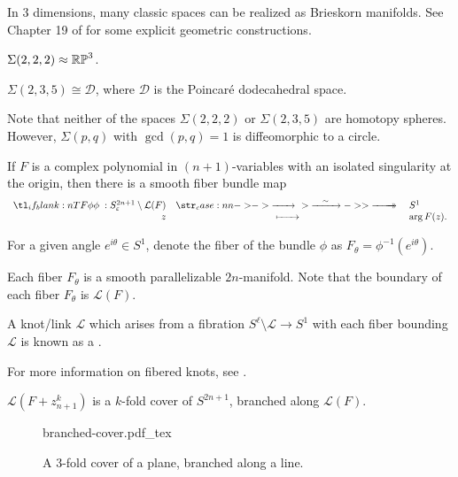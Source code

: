 In $3$ dimensions, many classic spaces can be realized as Brieskorn manifolds.
See Chapter 19 of \cite{kauffman1987knots} for some explicit geometric constructions.
\begin{proposition}
	$\Sigma(2,2,2)\approx \mathbb{RP}^3$.
\end{proposition}

\begin{proposition}
	$\Sigma(2,3,5)\cong \mathscr{D}$, where $\mathscr{D}$ is the Poincar\'e dodecahedral space.
\end{proposition}

Note that neither of the spaces $\Sigma(2,2,2)$ or $\Sigma(2,3,5)$ are homotopy spheres. However, $\Sigma(p,q)$ with $\gcd(p,q)=1$ is diffeomorphic to a circle.

\begin{theorem}\label{thm:fibration}
	If $F$ is a complex polynomial in $(n+1)$-variables with an isolated singularity at the origin, then there is a smooth fiber bundle map
	\[
		\lkxfunc{\phi}{S^{2n+1}_\varepsilon \setminus \L(F)}{S^1}{z}{\arg F(z).}
	\]
\end{theorem}

For a given angle $e^{i\theta}\in S^1$, denote the fiber of the bundle $\phi$ as $F_\theta = \phi^{-1}(e^{i\theta})$.

\begin{proposition}
	Each fiber $F_\theta$ is a smooth parallelizable $2n$-manifold.
	Note that the boundary of each fiber $F_\theta$ is $\mathcal{L}(F)$. 
\end{proposition}

\begin{definition}
	A knot/link $\mathcal{L}$ which arises from a fibration $S^\ell \setminus \mathcal{L} \to S^1$ with each fiber bounding $\mathcal{L}$ is known as a .
\end{definition}

For more information on fibered knots, see \cite{kauffmanneumann1977}.


\begin{proposition}
	$\mathcal{L}(F+z_{n+1}^k)$ is a $k$-fold cover of $S^{2n+1}$, branched along $\mathcal{L}(F)$.
\end{proposition}

\begin{figure}[ht]
	\centering
	{branched-cover.pdf_tex}
	\caption{A $3$-fold cover of a plane, branched along a line.}
\end{figure}

